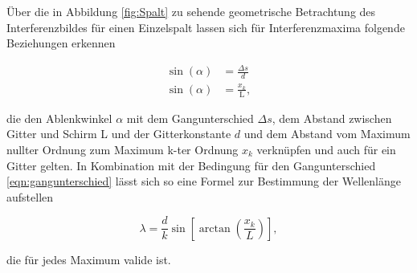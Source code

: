         Über die in Abbildung \ref{fig:Spalt} zu sehende geometrische Betrachtung des Interferenzbildes für einen Einzelspalt lassen sich für Interferenzmaxima folgende Beziehungen erkennen

        \begin{align*}
            \sin \left(\alpha\right) &= \frac{\Delta s}{d} \\
            \sin \left(\alpha\right) &= \frac{x_k}{\text{L}} ,
        \end{align*}

        die den Ablenkwinkel $\alpha$ mit dem Gangunterschied $\Delta s$, dem Abstand zwischen Gitter und Schirm L und der Gitterkonstante $d$ und dem Abstand vom Maximum nullter Ordnung zum Maximum k-ter 
        Ordnung $x_k$ verknüpfen und auch für ein Gitter gelten. In Kombination mit der Bedingung für den Gangunterschied \ref{eqn:gangunterschied} lässt sich so eine Formel zur Bestimmung der Wellenlänge aufstellen

        \begin{equation}
            \lambda = \frac{d}{k} \sin\left[\arctan \left(\frac{x_k}{L}\right) \right],
            \label{eqn:Wellenlänge}
        \end{equation}

        die für jedes Maximum valide ist.